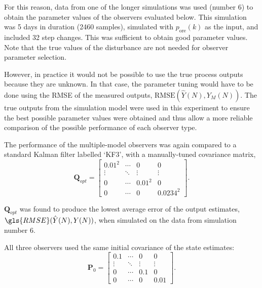 For this reason, data from one of the longer simulations was used (number 6) to obtain the parameter values of the observers evaluated below. This simulation was 5 days in duration (2460 samples), simulated with $p_\text{ore}(k)$ as the input, and included 32 step changes. This was sufficient to obtain good parameter values. Note that the true values of the disturbance are not needed for observer parameter selection.

However, in practice it would not be possible to use the true process outputs because they are unknown. In that case, the parameter tuning would have to be done using the \gls{RMSE} of the measured outputs, $\text{RMSE}(\hat{Y}(N), Y_M(N))$. The true outputs from the simulation model were used in this experiment to ensure the best possible parameter values were obtained and thus allow a more reliable comparison of the possible performance of each observer type.

The performance of the multiple-model observers was again compared to a standard Kalman filter labelled `KF3', with a manually-tuned covariance matrix,
\begin{equation} \label{eq:Q_opt}
	\mathbf{Q}_{opt}=\begin{bmatrix}
		0.01^2 & \cdots & 0 & 0 \\
		\vdots & \ddots & \vdots & \vdots \\
		0 & \cdots & 0.01^2 & 0 \\
		0 & \cdots & 0 & 0.0234^2
	\end{bmatrix}.
\end{equation}

$\mathbf{Q}_{opt}$ was found to produce the lowest average error of the output estimates, $\gls{RMSE}(\hat{Y}(N),Y(N))$, when simulated on the data from simulation number 6.

All three observers used the same initial covariance of the state estimates:
\begin{equation} \label{eq:P0}
	\mathbf{P}_0=\begin{bmatrix}
		0.1 & \cdots & 0 & 0 \\
		\vdots & \ddots & \vdots & \vdots \\
		0 & \cdots & 0.1 & 0 \\
		0 & \cdots & 0 & 0.01
	\end{bmatrix}.
\end{equation}

